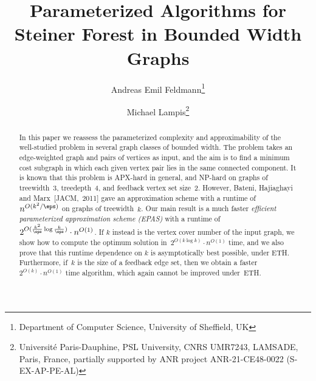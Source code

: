\documentclass[a4paper]{article}
\title{Parameterized Algorithms for\\
Steiner Forest in Bounded Width Graphs}
\author{Andreas Emil Feldmann\thanks{Department of Computer Science, University 
of Sheffield, UK}
\and
Michael Lampis\thanks{Universit\'{e} Paris-Dauphine, PSL University, CNRS 
UMR7243, LAMSADE, Paris, France, partially supported by ANR project 
ANR-21-CE48-0022 (S-EX-AP-PE-AL)}
}
\date{}
\newcommand{\SF}{\pname{Steiner Forest}\xspace}
\begin{document}
\maketitle
%

\begin{abstract}

In this paper we reassess the parameterized complexity and approximability of
the well-studied \SF problem in several graph classes of bounded width. The
problem takes an edge-weighted graph and pairs of vertices as input, and the
aim is to find a minimum cost subgraph in which each given vertex pair lies in
the same connected component.  It is known that this problem is APX-hard in
general, and NP-hard on graphs of treewidth~3, treedepth~4, and feedback vertex
set size~2. However, Bateni, Hajiaghayi and Marx~[JACM,~2011] gave an approximation scheme
with a runtime of~$n^{O(k^2/\eps)}$ on graphs of treewidth~$k$. Our main result
is a much faster \emph{efficient parameterized approximation scheme (EPAS)}
with a runtime of~$2^{O(\frac{k^2}{\eps}\log\frac{k}{\eps})}\cdot n^{O(1)}$. If
$k$ instead is the vertex cover number of the input graph, we show how to
compute the optimum solution in~$2^{O(k\log k)}\cdot n^{O(1)}$ time, and we
also prove that this runtime dependence on $k$ is asymptotically best possible,
under ETH.  Furthermore, if~$k$ is the size of a feedback edge set, then we
obtain a faster~$2^{O(k)}\cdot n^{O(1)}$ time algorithm, which again cannot be
improved under~ETH.

\end{abstract}

%
%
%
%
%
%
%
%
%
%
%
%
%
%
%
%
%







%







\printbibliography

\newpage
\appendix
\end{document}

